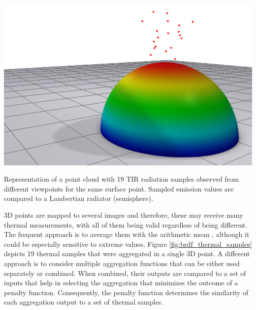 \begin{marginfigure}[.0cm]
	\includegraphics{figs/thermal_projection/brdf_thermal.png}
	\caption{Representation of a point cloud with 19 TIR radiation samples observed from different viewpoints for the same surface point. Sampled emission values are compared to a Lambertian radiator (semisphere). }
	\label{fig:brdf_thermal_samples}
\end{marginfigure}
3D points are mapped to several images and therefore, these may receive many thermal measurements, with all of them being valid regardless of being different. The frequent approach is to average them with the arithmetic mean \cite{javadnejad_photogrammetric_2020}, although it could be especially sensitive to extreme values. Figure \ref{fig:brdf_thermal_samples} depicts 19 thermal samples that were aggregated in a single 3D point. A different approach is to consider multiple aggregation functions that can be either used separately or combined. When combined, their outputs are compared to a set of inputs that help in selecting the aggregation that minimizes the outcome of a penalty function. Consequently, the penalty function determines the similarity of each aggregation output to a set of thermal samples.

